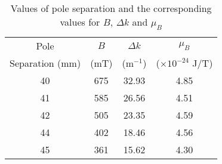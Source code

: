 \begin{table}[H]
    \centering
    \begin{tabular}{cccc} \hline
        Pole & $B$ & $\Delta k$ & $\mu_B$ \\ 
        Separation (mm) & (mT) & (m$^{-1}$) & ($\times 10^{-24}$ J/T) \\ \hline
        40 & 675 & 32.93 & 4.85 \\ 
        41 & 585 & 26.56 & 4.51 \\ 
        42 & 505 & 23.35 & 4.59 \\ 
        44 & 402 & 18.46 & 4.56 \\ 
        45 & 361 & 15.62 & 4.30 \\ \hline
    \end{tabular}    
        \caption{Values of pole separation and the corresponding values for $B$, $\Delta k$ and $\mu_B$}
        \label{tab:3}
    \end{table}
